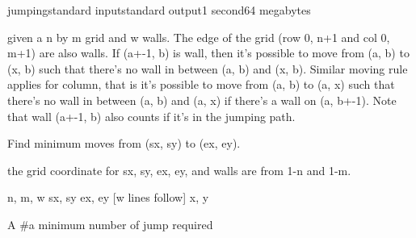 \begin{problem}{jumping}{standard input}{standard output}{1 second}{64 megabytes}

given a n by m grid and w walls. The edge of the grid (row 0, n+1 and col 0, m+1) are also walls. If (a+-1, b) is wall, then it's possible to move from (a, b) to (x, b) such that there's no wall in between (a, b) and (x, b). Similar moving rule applies for column, that is it's possible to move from (a, b) to (a, x) such that there's no wall in between (a, b) and (a, x) if there's a wall on (a, b+-1). Note that wall (a+-1, b) also counts if it's in the jumping path.

Find minimum moves from (sx, sy) to (ex, ey).

the grid coordinate for sx, sy, ex, ey, and walls are from 1-n and 1-m.

\InputFile
n, m, w
sx, sy
ex, ey
[w lines follow]
x, y

\OutputFile
A #a minimum number of jump required

\Examples

\begin{example}
%
%
\end{example}

\end{problem}

